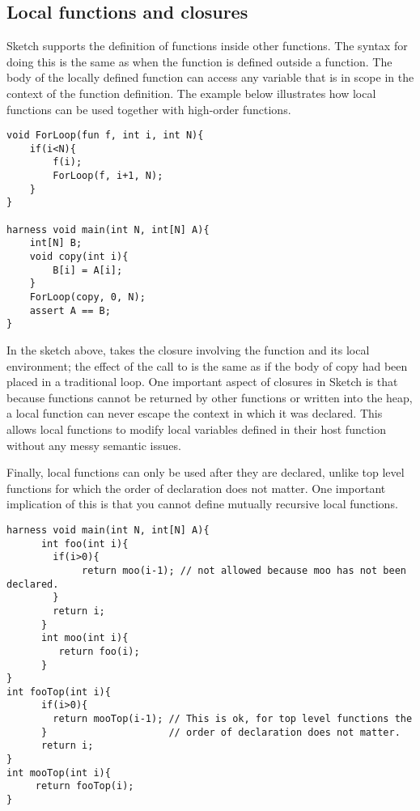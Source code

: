 \subsection{Local functions and closures}
Sketch supports the definition of functions inside other functions. The syntax for doing this is the same as when the function is defined outside a function. The body of the locally defined function can access any variable that is in scope in the context of the function definition. The example below illustrates how local functions can be used together with high-order functions. 

\begin{lstlisting}
void ForLoop(fun f, int i, int N){
	if(i<N){
		f(i);
		ForLoop(f, i+1, N);
	}
}

harness void main(int N, int[N] A){
	int[N] B;
	void copy(int i){
		B[i] = A[i];
	}
	ForLoop(copy, 0, N);
	assert A == B;
}
\end{lstlisting}
	
In the sketch above,  takes the closure involving the function  and its local environment; the effect of the call to  is the same as if the body of copy had been placed in a traditional  loop. 
One important aspect of closures in Sketch is that because functions cannot be returned by other functions or written into the heap, a local function can never escape the context in which it was declared. This allows local functions to modify local variables defined in their host function without any messy semantic issues.

Finally, local functions can only be used after they are declared, unlike top level functions for which the order of declaration does not matter. One important implication of this is that you cannot define mutually recursive local functions.

\begin{lstlisting}
harness void main(int N, int[N] A){
      int foo(int i){
        if(i>0){
             return moo(i-1); // not allowed because moo has not been declared.
        }
        return i;
      }
      int moo(int i){
         return foo(i);
      }
}
int fooTop(int i){
      if(i>0){
        return mooTop(i-1); // This is ok, for top level functions the 
      }                     // order of declaration does not matter.
      return i;
}
int mooTop(int i){
     return fooTop(i);
}
\end{lstlisting}



